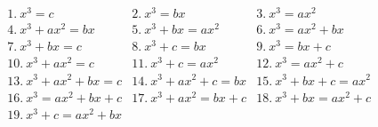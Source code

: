 \documentclass[preview]{standalone}
\begin{document}
\begin{align*}
&1.\ x^3=c &2.\ x^3=bx &3.\ x^3=ax^2\\ &4.\ x^3+ax^2=bx &5.\ x^3+bx=ax^2 &6.\ x^3=ax^2+bx \\ &7.\ x^3+bx=c &8.\ x^3+c=bx &9.\ x^3=bx+c \\ &10.\ x^3+ax^2=c &11.\ x^3+c=ax^2 &12.\ x^3=ax^2+c \\ &13.\ x^3+ax^2+bx=c &14.\ x^3+ax^2+c=bx &15.\ x^3+bx+c=ax^2 \\ &16.\ x^3=ax^2+bx+c &17.\ x^3+ax^2=bx+c &18.\ x^3+bx=ax^2+c \\ &19.\ x^3+c=ax^2+bx
\end{align*}
\end{document}
